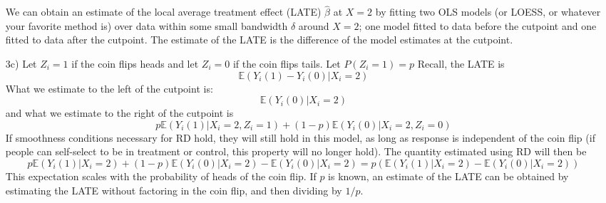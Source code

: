 \documentclass[11pt]{report}
\newcommand{\E}[0]{\mathbb{E}}
\begin{document}
\begin{itemize}
	We can obtain an estimate of the local average
	treatment effect (LATE) $\hat \beta$ at $X=2$ 
	by fitting two OLS models (or LOESS, or whatever your favorite method is)
         over data within some small bandwidth $\delta$ around $X = 2$;
         one model fitted to data before the cutpoint and one fitted to data after the cutpoint.
	The estimate of the LATE is the difference of the model estimates at the cutpoint.
\item[3c)]
	Let $Z_i = 1$ if the coin flips heads and let $Z_i = 0$ if the coin flips tails.
	Let $P(Z_i = 1) = p$
	Recall, the LATE is
	$$
	  \E(Y_i(1) - Y_i(0) | X_i = 2)
	$$
	What we estimate to the left of the cutpoint is:
	$$
	  \E(Y_i(0)|X_i = 2)
	$$
	and what we estimate to the right of the cutpoint is
	$$
	  p\E(Y_i(1) | X_i = 2, Z_i = 1) + (1-p)\E(Y_i(0) | X_i = 2, Z_i = 0)
	$$
	If smoothness conditions necessary for RD hold,
	they will still hold in this model, as long as response is independent of the coin flip
	(if people can self-select to be in treatment or control, this property will no longer hold).
	The quantity estimated using RD will then be
	$$
	  p\E(Y_i(1) | X_i = 2) + (1-p)\E(Y_i(0) | X_i = 2) - \E(Y_i(0)|X_i = 2) =
	  p(\E(Y_i(1) | X_i = 2) - \E(Y_i(0) | X_i = 2))
	$$
	This expectation scales with the probability of heads of the coin flip.
	If $p$ is known, an estimate of the LATE can be obtained by 
	estimating the LATE without factoring in the coin flip, and then dividing by $1/p$.
\end{itemize}
\end{document}
